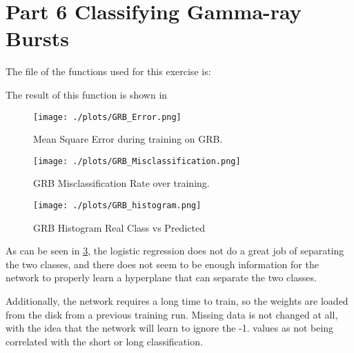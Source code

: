 \section{Part 6 Classifying Gamma-ray Bursts}

The file of the functions used for this exercise is:



The result of this function is shown in



\begin{figure}[h!]
  \centering
  \texttt{[image: ./plots/GRB\_Error.png]}
  \caption{Mean Square Error during training on GRB.}
  \label{fig:mse}
\end{figure}

\begin{figure}[h!]
  \centering
  \texttt{[image: ./plots/GRB\_Misclassification.png]}
  \caption{GRB Misclassification Rate over training.}
  \label{fig:misclassify}
\end{figure}

\begin{figure}[h!]
  \centering
  \texttt{[image: ./plots/GRB\_histogram.png]}
  \caption{GRB Histogram Real Class vs Predicted}
  \label{fig:predction}
\end{figure}

As can be seen in \ref{fig:predction}, the logistic regression does not do a great
job of separating the two classes, and there does not seem to be enough
information for the network to properly learn a hyperplane that can
separate the two classes.

Additionally, the network requires a long time to train, so the
weights are loaded from the disk from a previous training run. Missing data is not
changed at all, with the idea that the network will learn to ignore the -1. values as not
being correlated with the short or long classification.

